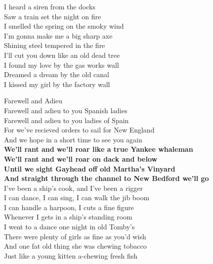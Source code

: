 \documentclass[letterpaper,9pt]{article}
\begin{document}
I heard a siren from the docks \\
Saw a train set the night on fire \\
I smelled the spring on the smoky wind \\

I'm gonna make me a big sharp axe \\
Shining steel tempered in the fire \\
I'll cut you down like an old dead tree \\

I found my love by the gas works wall \\
Dreamed a dream by the old canal \\
I kissed my girl by the factory wall \\

\newpage
{}
\Huge
Farewell and Adieu\\

\LARGE
Farewell and adieu to you Spanish ladies \\
Farewell and adieu to you ladies of Spain \\
For we’ve recieved orders to sail for New England \\
And we hope in a short time to see you again \\

\textbf{We’ll rant and we’ll roar like a true Yankee whaleman \\
We’ll rant and we’ll roar on dack and below \\
Until we sight Gayhead off old Martha’s Vinyard \\
And straight through the channel to New Bedford we’ll go} \\

I’ve been a ship’s cook, and I’ve been a rigger \\
I can dance, I can sing, I can walk the jib boom \\
I can handle a harpoon, I cuts a fine figure  \\
Whenever I gets in a ship’s standing room \\

I went to a dance one night in old Tomby’s \\
There were plenty of girls as fine as you’d wish \\
And one fat old thing she was chewing tobacco \\
Just like a young kitten a-chewing fresh fish \\
\end{document}
